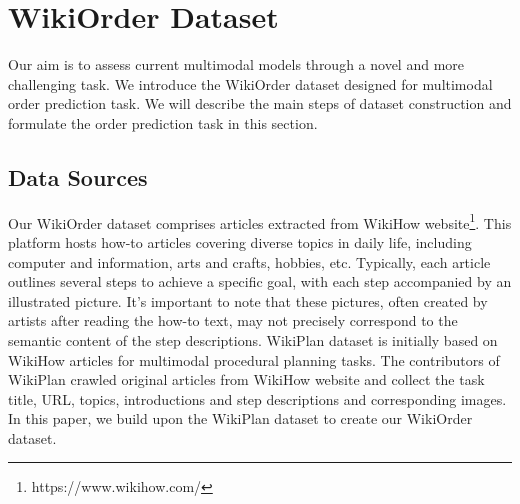 \documentclass[11pt]{article}
\begin{document}
\section{WikiOrder Dataset}
Our aim is to assess current multimodal models through a novel and more challenging task. We introduce the WikiOrder dataset designed for multimodal order prediction task. We will describe the main steps of dataset construction and formulate the order prediction task in this section.

\subsection{Data Sources}
Our WikiOrder dataset comprises articles extracted from WikiHow website\footnote{https://www.wikihow.com/}. This platform hosts how-to articles covering diverse topics in daily life, including computer and information, arts and crafts, hobbies, etc. Typically, each article outlines several steps to achieve a specific goal, with each step accompanied by an illustrated picture. It's important to note that these pictures, often created by artists after reading the how-to text, may not precisely correspond to the semantic content of the step descriptions.
WikiPlan dataset\citep{lu2023multimodal} is initially based on WikiHow articles for multimodal procedural planning tasks. The contributors of WikiPlan crawled original articles from WikiHow website and collect the task title, URL, topics, introductions and step descriptions and corresponding images. In this paper, we build upon the WikiPlan dataset to create our WikiOrder dataset.
\end{document}
